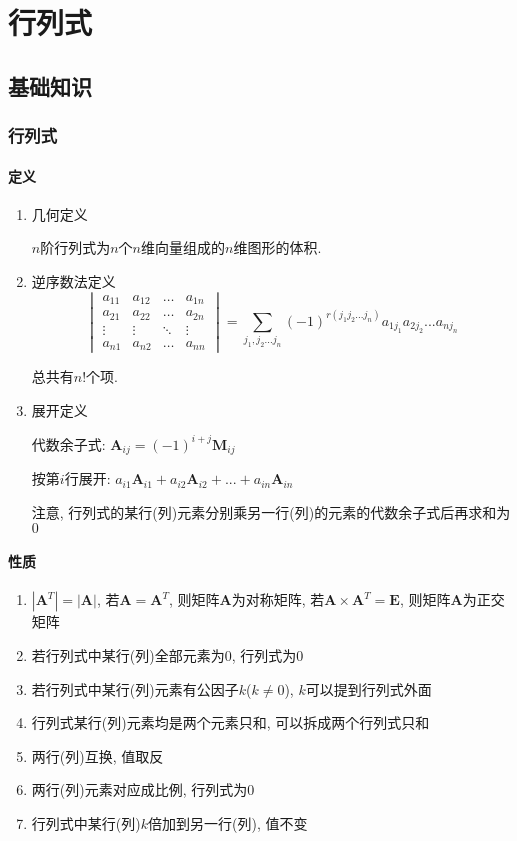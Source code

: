 \chapter{行列式}
\section{基础知识}
\subsection{行列式}
\subsubsection{定义}
\begin{enumerate}
\item 几何定义\par $ n $阶行列式为$ n $个$ n $维向量组成的$ n $维图形的体积.
\item 逆序数法定义
\begin{equation*}
\begin{vmatrix}
a_{11}	&a_{12}  &\dots  &a_{1n}  \\
a_{21}	&a_{22}  &\dots  &a_{2n}  \\
\vdots	&\vdots  &\ddots  &\vdots  \\
a_{n1}	&a_{n2}  &\dots  &a_{nn}
\end{vmatrix}  = \sum_{j_{1},j_{2}...j_{n}}(-1)^{r(j_{1}j_{2}...j_{n})}a_{1j_{1}}a_{2j_{2}}...a_{nj_{n}}
\end{equation*}\par
总共有$ n! $个项.
\item 展开定义\par 代数余子式: $ \bm{A}_{ij}=(-1)^{i+j}\bm{M}_{ij} $\par 按第$ i $行展开: $ a_{i1}\bm{A}_{i1}+a_{i2}\bm{A}_{i2}+...+a_{in}\bm{A}_{in} $\par 注意, 行列式的某行(列)元素分别乘另一行(列)的元素的代数余子式后再求和为$ 0 $
\end{enumerate}
\subsubsection{性质}
\begin{enumerate}
\item $ |\bm{A}^{T}|=|\bm{A}| $, 若$ \bm{A} = \bm{A}^{T} $, 则矩阵$ \bm{A} $为对称矩阵, 若$ \bm{A} \times \bm{A}^{T} = \bm{E} $, 则矩阵$ \bm{A} $为正交矩阵
\item 若行列式中某行(列)全部元素为$ 0 $, 行列式为$ 0 $
\item 若行列式中某行(列)元素有公因子$ k $($ k\neq 0 $), $ k $可以提到行列式外面
\item 行列式某行(列)元素均是两个元素只和, 可以拆成两个行列式只和
\item 两行(列)互换, 值取反
\item 两行(列)元素对应成比例, 行列式为$ 0 $
\item 行列式中某行(列)$ k $倍加到另一行(列), 值不变
\end{enumerate}
